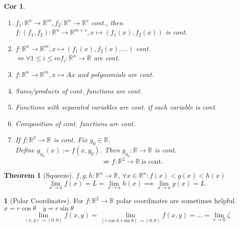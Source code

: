 \documentclass[a4paper, 10pt]{article}
\newtheorem*{corollary}{Cor}
\theoremstyle{definition}
\theoremstyle{colored}
\newtheorem*{note_wrapper}{}
\theoremstyle{ex}
\theoremstyle{named}
\newtheorem*{ntheorem_wrapper}{Theorem}
\newenvironment{ntheorem}%
    {\begin{mdframed}[style=important]\begin{ntheorem_wrapper}}%
    {\end{ntheorem_wrapper}\end{mdframed}}
\newenvironment{note}%
    {\begin{mdframed}[style=trick]\begin{note_wrapper}}%
    {\end{note_wrapper}\end{mdframed}}
\newcommand{\R}{\mathbb{R}}
\begin{document}
\begin{corollary}
    \begin{enumerate}
        \item \(f_1: \R^n \to \R^m, f_2: \R^n \to \R^s\) cont., then \(f: (f_1, f_2): \R^n \to \R^{m + s}, x \mapsto (f_1(x), f_2(x))\) is cont.
        \item \(f: \R^n \to \R^m, x \mapsto (f_1(x), f_2(x), \ldots)\) cont.\\  \(\iff  \forall 1 \leq i \leq m f_i: \R^n \to \R\) are cont.
        \item \(f: \R^n \to \R^m, x \mapsto Ax\) and polynomials are cont.
        \item Sums/products of cont. functions are cont.
        \item Functions with separated variables are cont. if each variable is cont.
        \item Composition of cont. functions are cont.
        \item If \(f: \R^2 \to \R\) is cont. Fix \(y_0 \in \R\). \\ Define \(g_{y_0}(x) := f(x, y_0)\). Then \(g_{y_0}: \R \to \R\) is cont.
        \[\not\Rightarrow f: \R^2 \to \R \ \text{is cont.}\]
    \end{enumerate}
\end{corollary}

\begin{ntheorem}[Squeeze]
    \(f, g, h : \R^n \to \R\), \(\forall x \in \R^n: f(x) < g(x) < h(x)\)
    \[\lim_{x \to a} f(x) = L = \lim_{x \to a} h(x) \implies \lim_{x \to a}g(x) = L\]
\end{ntheorem}

\begin{note}[Polar Coordinates]
    For \(f: \R^2 \to \R\) polar coordinates are sometimes helpful.
    \(x = r \cos \theta \quad y = r \sin \theta\)
    \[\lim_{(x, y) \to (0, 0)}f(x, y) = \lim_{(r\cos\theta, r\sin\theta)  \to (0,0)}f(x, y) = \ldots = \lim_{r \to 0} \zeta\]
\end{note}
\end{document}

